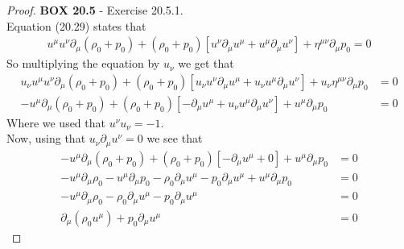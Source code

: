 \documentclass[11pt]{article}
\theoremstyle{definition}
\begin{document}
\cleardoublepage
\begin{proof}{\textbf{BOX 20.5} - Exercise 20.5.1.}\\
Equation (20.29) states that
\begin{align*}
    u^{\mu}u^{\nu}\partial_{\mu}(\rho_0 + p_0)
    + (\rho_0 + p_0)[u^{\nu}\partial_{\mu}u^\mu + u^\mu \partial_\mu u^\nu] 
    + \eta^{\mu\nu}\partial_\mu p_0 = 0
\end{align*}
So multiplying the equation by $u_\nu$ we get that
\begin{align*}
    u_{\nu}u^{\mu}u^{\nu}\partial_{\mu}(\rho_0 + p_0)
    + (\rho_0 + p_0)[u_{\nu}u^{\nu}\partial_{\mu}u^\mu + u_{\nu}u^\mu \partial_\mu u^\nu] 
    + u_{\nu}\eta^{\mu\nu}\partial_\mu p_0
    &= 0\\
    -u^{\mu}\partial_{\mu}(\rho_0 + p_0)
    + (\rho_0 + p_0)[-\partial_{\mu}u^\mu + u_{\nu}u^\mu \partial_\mu u^\nu] 
    + u^{\mu}\partial_\mu p_0
    &= 0
\end{align*}
Where we used that $u^\nu u_\nu = -1$.\\
Now, using that $u_\nu\partial_{\mu}u^\nu = 0$ we see that
\begin{align*}
    -u^{\mu}\partial_{\mu}(\rho_0 + p_0)
    + (\rho_0 + p_0)[-\partial_{\mu}u^\mu + 0] 
    + u^{\mu}\partial_\mu p_0
    &= 0\\
    -u^{\mu}\partial_{\mu}\rho_0 - u^{\mu}\partial_{\mu}p_0
    -\rho_0\partial_{\mu} u^\mu - p_0\partial_{\mu}u^\mu
    + u^{\mu}\partial_\mu p_0
    &= 0\\
    -u^{\mu}\partial_{\mu}\rho_0
    -\rho_0\partial_{\mu} u^\mu - p_0\partial_{\mu}u^\mu
    &= 0\\
    \partial_{\mu}(\rho_0 u^{\mu}) + p_0\partial_{\mu}u^\mu
    &= 0
\end{align*}
\end{proof}
\end{document}
